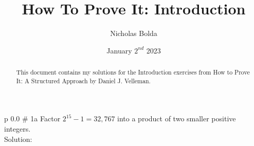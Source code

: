 \documentclass[12pt]{article}
\title{How To Prove It: Introduction}
\author{Nicholas Bolda}
\date{January \(2^{nd}\) 2023}
\begin{document}
\markboth{\theauthor}{\thetitle}

\maketitle

\begin{abstract}
    This document contains my solutions for the Introduction exercises from How to Prove It: A Structured Approach by Daniel J. Velleman.
\end{abstract}


\begin{problem}{p 0.0 \# 1a}
    Factor \(2^{15} - 1=32,767\) into a product of two smaller positive integers. \\
    
    Solution:
        
\end{problem}
\end{document}
